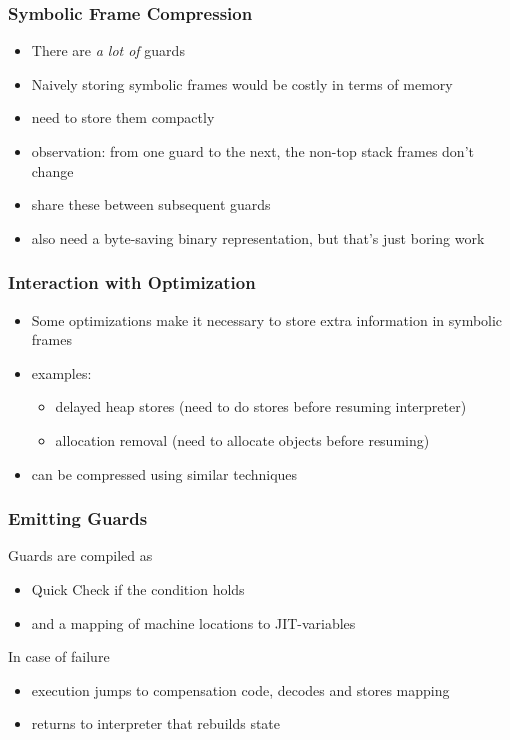 \documentclass[utf8x]{beamer}
\begin{document}
\begin{frame}
  \frametitle{Symbolic Frame Compression}
  \begin{itemize}
      \item There are \emph{a lot of} guards
      \item Naively storing symbolic frames would be costly in terms of memory
      \item need to store them compactly
      \item observation: from one guard to the next, the non-top stack frames don't change
      \item share these between subsequent guards
      \pause
      \item also need a byte-saving binary representation, but that's just boring work
  \end{itemize}
\end{frame}

\begin{frame}
  \frametitle{Interaction with Optimization}
  \begin{itemize}
      \item Some optimizations make it necessary to store extra information in symbolic frames
      \item examples:
          \begin{itemize}
              \item delayed heap stores (need to do stores before resuming interpreter)
              \item allocation removal (need to allocate objects before resuming)
          \end{itemize}
      \item can be compressed using similar techniques
  \end{itemize}
\end{frame}

\begin{frame}
  \frametitle{Emitting Guards}
  Guards are compiled as
  \begin{itemize}
    \item Quick Check if the condition holds
    \item and a mapping of machine locations to JIT-variables %
  \end{itemize}
  In case of failure
  \begin{itemize}
    \item execution jumps to compensation code, decodes and stores mapping
    \item returns to interpreter that rebuilds state
  \end{itemize}
\end{frame}
\end{document}

